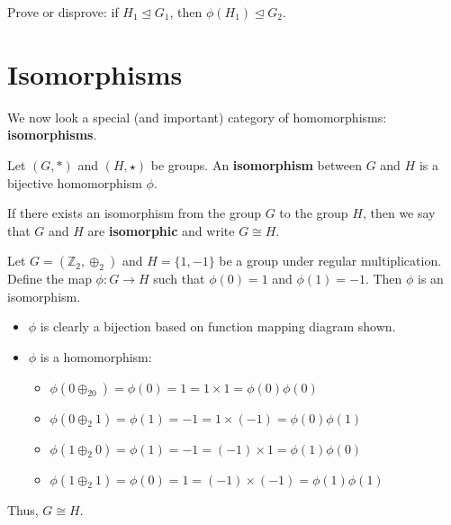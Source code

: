 \begin{exercise}
    Prove or disprove: if $H_1 \unlhd G_1$, then $\phi(H_1) \unlhd G_2$.
\end{exercise}

\section{Isomorphisms}
We now look a special (and important) category of homomorphisms: \textbf{isomorphisms}.

\begin{definition}
    Let $(G, \ast)$ and $(H, \star)$ be groups. An \textbf{isomorphism} between $G$ and $H$ is a bijective homomorphism $\phi$.
\end{definition}

If there exists an isomorphism from the group $G$ to the group $H$, then we say that $G$ and $H$ are \textbf{isomorphic} and write $G \cong H$.

\newpage

\begin{example}
    Let $G = (\mathbb{Z}_2, \oplus_2)$ and $H = \{1, -1\}$ be a group under regular multiplication. Define the map $\phi: G \to H$ such that $\phi(0) = 1$ and $\phi(1) = -1$. Then $\phi$ is an isomorphism.

    \begin{itemize}
        \item $\phi$ is clearly a bijection based on function mapping diagram shown.
        \begin{figure}[h]
            \centering
        \end{figure}
        \item $\phi$ is a homomorphism:\begin{itemize}
            \item $\phi(0\oplus_20) = \phi(0) = 1 = 1 \times 1 = \phi(0)\phi(0)$
            \item $\phi(0 \oplus_2 1) = \phi(1) = -1 = 1 \times (-1) = \phi(0)\phi(1)$
            \item $\phi(1 \oplus_2 0) = \phi(1) = -1 = (-1) \times 1 = \phi(1)\phi(0)$
            \item $\phi(1 \oplus_2 1) = \phi(0) = 1 = (-1) \times (-1) = \phi(1)\phi(1)$
        \end{itemize}
    \end{itemize}
    Thus, $G \cong H$.
\end{example}

